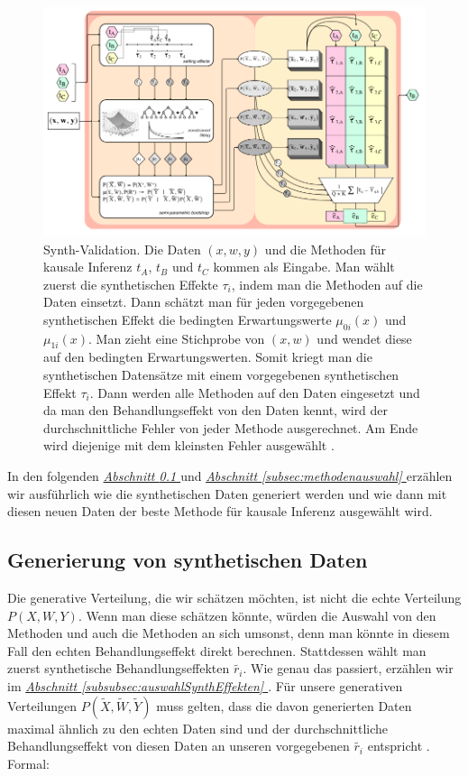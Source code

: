 \documentclass[12pt,a4paper,twoside]{scrartcl}
\numberwithin{equation}{section}
\newcommand{\refsec}[1]{\emph{\hyperref[#1]{Abschnitt \ref*{#1} }}}
\begin{document}
\begin{center}
  \vspace{6mm}
  \begin{figure}[h]
    \centering
    \includegraphics[height=0.5\textwidth, width=1\textwidth]{figures/synth-validation.png}
    \caption[Synth-Validation] {Synth-Validation\cite{schuler2017synth}. Die Daten $(x,w,y)$ und die Methoden für kausale Inferenz $t_A$, $t_B$ und $t_C$ kommen als Eingabe. Man wählt zuerst die synthetischen Effekte $\tau_i$, indem man die Methoden auf die Daten einsetzt. Dann schätzt man für jeden vorgegebenen synthetischen Effekt die bedingten Erwartungswerte $\mu_{0i}(x)$ und $\mu_{1i}(x)$. Man zieht eine Stichprobe von $(x,w)$ und wendet diese auf den bedingten Erwartungswerten. Somit kriegt man die synthetischen Datensätze mit einem vorgegebenen synthetischen Effekt $\tau_i$. Dann werden alle Methoden auf den Daten eingesetzt und da man den Behandlungseffekt von den Daten kennt, wird der durchschnittliche Fehler von jeder Methode ausgerechnet. Am Ende wird diejenige mit dem kleinsten Fehler ausgewählt \cite{schuler2017synth}.}\label{fig:synthValidation}
  \end{figure}
\end{center}

\noindent
In den folgenden \refsec{subsec:generierungSynthDaten} und \refsec{subsec:methodenauswahl} erzählen wir ausführlich wie die synthetischen Daten generiert werden und wie dann mit diesen neuen Daten der beste Methode für kausale Inferenz ausgewählt wird.\par

  	\subsection{Generierung von synthetischen Daten}\label{subsec:generierungSynthDaten}
  	Die generative Verteilung, die wir schätzen möchten, ist nicht die echte Verteilung $P(X,W,Y)$. Wenn man diese schätzen könnte, würden die Auswahl von den Methoden und auch die Methoden an sich umsonst, denn man könnte in diesem Fall den echten Behandlungseffekt direkt berechnen. Stattdessen wählt man zuerst synthetische Behandlungseffekten $\tilde{r_i}$. Wie genau das passiert, erzählen wir im \refsec{subsubsec:auswahlSynthEffekten}. Für unsere generativen Verteilungen  $P(\widetilde{X},\widetilde{W},\widetilde{Y})$ muss gelten, dass die davon generierten Daten maximal ähnlich zu den echten Daten sind und der durchschnittliche Behandlungseffekt von diesen Daten an unseren vorgegebenen $\tilde{r_i}$  entspricht \cite{schuler2017synth}. Formal:\par
  	
\end{document}
